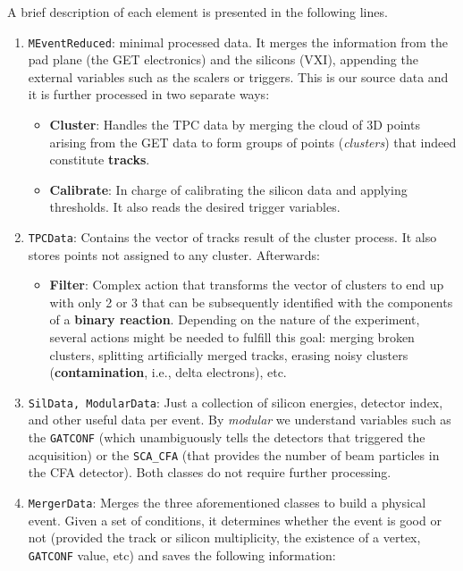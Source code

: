 \documentclass[11pt, a4paper, english]{article}
\begin{document}
A brief description of each element is presented in the following lines.
\begin{enumerate}
	\item \lstinline|MEventReduced|: minimal processed data. It merges the information from the pad plane (the GET 
	electronics) and the silicons (VXI), appending the external variables such as the scalers or triggers. This is our source data and it is further processed in two separate ways:
	\begin{itemize}
		\item \textbf{Cluster}: Handles the TPC data by merging the cloud of 3D points arising from the GET data to 
		form groups of points (\textit{clusters}) that indeed constitute \textbf{tracks}. 
		\item \textbf{Calibrate}: In charge of calibrating the silicon data and applying thresholds. It also reads the desired trigger variables.
	\end{itemize}
	\item \lstinline|TPCData|: Contains the vector of tracks result of the cluster process. It also stores points not assigned to any cluster. Afterwards:
	\begin{itemize}
		\item \textbf{Filter}: Complex action that transforms the vector of clusters to end up with only 2 or 3 that can be subsequently identified with the components of a \textbf{binary reaction}. Depending on the nature of the experiment, several actions might be needed to fulfill this goal: merging broken clusters, splitting artificially merged tracks, erasing noisy clusters (\textbf{contamination}, i.e., delta electrons), etc. 
	\end{itemize}
	\item \lstinline|SilData, ModularData|: Just a collection of silicon energies, detector index, and other useful data per event. By \textit{modular} we understand variables such as the \lstinline|GATCONF| (which unambiguously tells the detectors that triggered the acquisition) or the \lstinline|SCA_CFA| (that provides the number of beam particles in the CFA detector). Both classes do not require further processing. 
	\item \lstinline|MergerData|: Merges the three aforementioned classes to build a physical event. Given a set of conditions, it determines whether the event is good or not (provided the track or silicon multiplicity, the existence of a vertex, \lstinline|GATCONF| value, etc) and saves the following information:
	\begin{itemize}

\end{itemize}
\end{enumerate}
\end{document}
